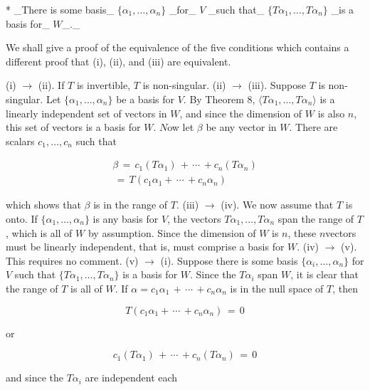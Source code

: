 * _There is some basis_ \(\{\alpha_{1},\ldots,\alpha_{n}\}\) _for_ \(V\) _such that_ \(\{T\alpha_{1},\ldots,T\alpha_{n}\}\) _is a basis for_ \(W\)_._

We shall give a proof of the equivalence of the five conditions which contains a different proof that (i), (ii), and (iii) are equivalent.

(i) \(\rightarrow\) (ii). If \(T\) is invertible, \(T\) is non-singular. (ii) \(\rightarrow\) (iii). Suppose \(T\) is non-singular. Let \(\{\alpha_{1},\ldots,\alpha_{n}\}\) be a basis for \(V\). By Theorem 8, \(\langle T\alpha_{1},\ldots,T\alpha_{n}\rangle\) is a linearly independent set of vectors in \(W\), and since the dimension of \(W\) is also \(n\), this set of vectors is a basis for \(W\). \(N\)ow let \(\beta\) be any vector in \(W\). There are scalars \(c_{1},\ldots,c_{n}\) such that

\[\begin{array}{l}\beta\,=\,c_{1}(T\alpha_{1})\,+\,\cdots\,+c_{n}(T\alpha_{n}) \\ \,=\,T(c_{1}\alpha_{1}+\,\cdots\,+c_{n}\alpha_{n})\end{array}\]

which shows that \(\beta\) is in the range of \(T\). (iii) \(\rightarrow\) (iv). We now assume that \(T\) is onto. If \(\{\alpha_{1},\ldots,\alpha_{n}\}\) is any basis for \(V\), the vectors \(T\alpha_{1},\ldots,T\alpha_{n}\) span the range of \(T\), which is all of \(W\) by assumption. Since the dimension of \(W\) is \(n\), these \(n\)vectors must be linearly independent, that is, must comprise a basis for \(W\). (iv) \(\rightarrow\) (v). This requires no comment. (v) \(\rightarrow\) (i). Suppose there is some basis \(\{\alpha_{i},\ldots,\alpha_{n}\}\) for \(V\) such that \(\{T\alpha_{1},\ldots,T\alpha_{n}\}\) is a basis for \(W\). Since the \(T\alpha_{i}\) span \(W\), it is clear that the range of \(T\) is all of \(W\). If \(\alpha=c_{1}\alpha_{1}\,+\,\cdots\,+c_{n}\alpha_{n}\) is in the null space of \(T\), then

\[T(c_{1}\alpha_{1}+\,\cdots\,+c_{n}\alpha_{n})\,=\,0\]

or

\[c_{1}(T\alpha_{1})\,+\,\cdots\,+c_{n}(T\alpha_{n})\,=\,0\]

and since the \(T\alpha_{i}\) are independent each 
